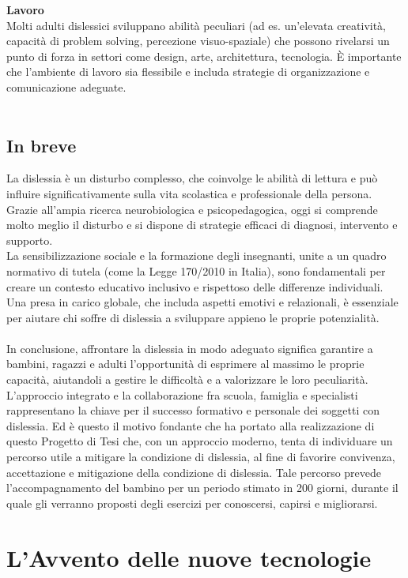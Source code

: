\documentclass[14pt]{extbook}
\begin{document}
\textbf{Lavoro}\\
Molti adulti dislessici sviluppano abilità peculiari (ad es. un’elevata creatività, capacità di problem solving, percezione visuo-spaziale) che possono rivelarsi un punto di forza in settori come design, arte, architettura, tecnologia. È importante che l’ambiente di lavoro sia flessibile e includa strategie di organizzazione e comunicazione adeguate.\\\\

\subsection{In breve}
La dislessia è un disturbo complesso, che coinvolge le abilità di lettura e può influire significativamente sulla vita scolastica e professionale della persona. Grazie all’ampia ricerca neurobiologica e psicopedagogica, oggi si comprende molto meglio il disturbo e si dispone di strategie efficaci di diagnosi, intervento e supporto.\\
La sensibilizzazione sociale e la formazione degli insegnanti, unite a un quadro normativo di tutela (come la Legge 170/2010 in Italia), sono fondamentali per creare un contesto educativo inclusivo e rispettoso delle differenze individuali. Una presa in carico globale, che includa aspetti emotivi e relazionali, è essenziale per aiutare chi soffre di dislessia a sviluppare appieno le proprie potenzialità.\\\\
In conclusione, affrontare la dislessia in modo adeguato significa garantire a bambini, ragazzi e adulti l’opportunità di esprimere al massimo le proprie capacità, aiutandoli a gestire le difficoltà e a valorizzare le loro peculiarità. L’approccio integrato e la collaborazione fra scuola, famiglia e specialisti rappresentano la chiave per il successo formativo e personale dei soggetti con dislessia. Ed è questo il motivo fondante che ha portato alla realizzazione di questo Progetto di Tesi che, con un approccio moderno, tenta di individuare un percorso utile a mitigare la condizione di dislessia, al fine di favorire convivenza, accettazione e mitigazione della condizione di dislessia. Tale percorso prevede l’accompagnamento del bambino per un periodo stimato in 200 giorni, durante il quale gli verranno proposti degli esercizi per conoscersi, capirsi e migliorarsi.\\
\pagebreak

\section{L'Avvento delle nuove tecnologie}
\end{document}
